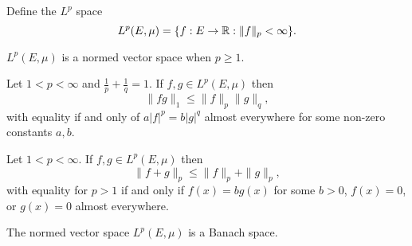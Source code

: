 \documentclass[class=book, crop=false]{standalone}
\begin{document}
        \begin{definition}[$L^p$ Space]
            Define the $L^p$ space
            \begin{equation*}
                L^p(E, \mu) = \{f : E \rightarrow \mathbb{R} : \|f\|_p < \infty\}.
            \end{equation*}
        \end{definition}

        \begin{theorem}
            $L^p(E, \mu)$ is a normed vector space when $p \geq 1$.
        \end{theorem}

        \begin{theorem}
            Let $1 < p < \infty$ and $\frac{1}{p} + \frac{1}{q} = 1$. If $f, g \in L^p(E, \mu)$ then
            \begin{equation*}
                \|fg\|_1 \leq \|f\|_p \|g\|_q,
            \end{equation*}
            with equality if and only of $a |f|^p = b |g|^q$ almost everywhere for some non-zero constants $a, b$.
        \end{theorem}

        \begin{theorem}
            Let $1 < p < \infty$. If $f, g \in L^p(E, \mu)$ then
            \begin{equation*}
                \|f + g\|_p \leq \|f\|_p + \|g\|_p,
            \end{equation*}
            with equality for $p > 1$ if and only if $f(x) = bg(x)$ for some $b > 0$, $f(x) = 0$, or $g(x) = 0$ almost everywhere.
        \end{theorem}

        \begin{theorem}
            The normed vector space $L^p(E, \mu)$ is a Banach space.
        \end{theorem}

        
\end{document}
